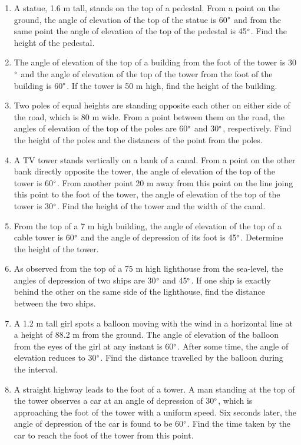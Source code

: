\begin{enumerate}[label=\thesection.\arabic*.,ref=\thesection.\theenumi]
\item A statue, 1.6 m tall, stands on the top of a pedestal. From a point on the ground, the angle of elevation of the top of the statue is 60$\degree$ and from the same point the angle of elevation of the top of the pedestal is 45$\degree$. Find the height of the pedestal.
\item The angle of elevation of the top of a building from the foot of the tower is 30$\degree$ and the angle of elevation of the top of the tower from the foot of the building is 60$\degree$. If the tower is 50 m high, find the height of the building.
\item Two poles of equal heights are standing opposite each other on either side of the road, which is 80 m wide. From a point between them on the road, the angles of elevation of the top of the poles are 60$\degree$ and 30$\degree$, respectively. Find the height of the poles and the distances of the point from the poles.
\item A TV tower stands vertically on a bank of a canal. From a point on the other bank directly opposite the tower, the angle of elevation of the top of the tower is 60$\degree$. From another point 20 m away from this point on the line joing this point to the foot of the tower, the angle of elevation of the top of the tower is 30$\degree$. Find the height of the tower and the width of the canal.
\item From the top of a 7 m high building, the angle of elevation of the top of a cable tower is 60$\degree$ and the angle of depression of its foot is 45$\degree$. Determine the height of the tower.
\item As observed from the top of a 75 m high lighthouse from the sea-level, the angles of depression of two ships are 30$\degree$ and 45$\degree$. If one ship is exactly behind the other on the same side of the lighthouse, find the distance between the two ships.
\item A 1.2 m tall girl spots a balloon moving with the wind in a horizontal line at a height of 88.2 m from the ground. The angle of elevation of the balloon from the eyes of the girl at any instant is 60$\degree$. After some time, the angle of elevation reduces to 30$\degree$. Find the distance travelled by the balloon during the interval.
\item A straight highway leads to the foot of a tower. A man standing at the top of the tower observes a car at an angle of depression of 30$\degree$, which is approaching the foot of the tower with a uniform speed. Six seconds later, the angle of depression of the car is found to be 60$\degree$. Find the time taken by the car to reach the foot of the tower from this point.

\end{enumerate}
